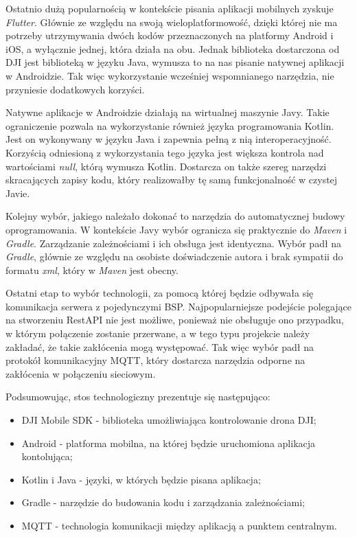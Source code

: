 Ostatnio dużą popularnością w kontekście pisania aplikacji mobilnych zyskuje \textit{Flutter}. Głównie ze względu na swoją wieloplatformowość, dzięki której nie ma potrzeby utrzymywania dwóch kodów przeznaczonych na platformy Android i iOS, a wyłącznie jednej, która działa na obu. Jednak biblioteka dostarczona od DJI jest biblioteką w języku Java, wymusza to na nas pisanie natywnej aplikacji w Androidzie. Tak więc wykorzystanie wcześniej wspomnianego narzędzia, nie przyniesie dodatkowych korzyści.

Natywne aplikacje w Androidzie działają na wirtualnej maszynie Javy. Takie ograniczenie pozwala na wykorzystanie również języka programowania Kotlin. Jest on wykonywany w języku Java i zapewnia pełną z nią interoperacyjność. Korzyścią odniesioną z wykorzystania tego języka jest większa kontrola nad wartościami \textit{null}, którą wymusza Kotlin. Dostarcza on także szereg narzędzi skracających zapisy kodu, który realizowałby tę samą funkcjonalność w czystej Javie.

Kolejny wybór, jakiego należało dokonać to narzędzia do automatycznej budowy oprogramowania. W kontekście Javy wybór ogranicza się praktycznie do \textit{Maven} i \textit{Gradle}. Zarządzanie zależnościami i ich obsługa jest identyczna. Wybór padł na \textit{Gradle}, głównie ze względu na osobiste doświadczenie autora i brak sympatii do formatu \textit{xml}, który w \textit{Maven} jest obecny.

Ostatni etap to wybór technologii, za pomocą której będzie odbywała się komunikacja serwera z pojedynczymi BSP. Najpopularniejsze podejście polegające na stworzeniu RestAPI nie jest możliwe, ponieważ nie obsługuje ono przypadku, w którym połączenie zostanie przerwane, a w tego typu projekcie należy zakładać, że takie zakłócenia mogą występować. Tak więc wybór padł na protokół komunikacyjny MQTT, który dostarcza narzędzia odporne na zakłócenia w połączeniu sieciowym.

Podsumowując, stos technologiczny prezentuje się następująco:
\begin{itemize}
    \setlength\itemsep{1mm} %
  \item DJI Mobile SDK - biblioteka umożliwiająca kontrolowanie drona DJI;
  \item Android - platforma mobilna, na której będzie uruchomiona aplikacja kontolująca;
  \item Kotlin i Java - języki, w których będzie pisana aplikacja;
  \item Gradle - narzędzie do budowania kodu i zarządzania zależnościami;
  \item MQTT - technologia komunikacji między aplikacją a punktem centralnym.
\end{itemize}

